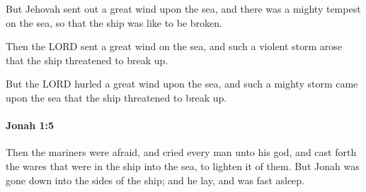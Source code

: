			\begin{versebox}
					\item[BHS] 
					\item[LXX] 
					\item[ASV] But Jehovah sent out a great wind upon the sea, and there was a mighty tempest on the sea, so that the ship was like to be broken.
					\item[NIV] Then the LORD sent a great wind on the sea, and such a violent storm arose that the ship threatened to break up.
					\item[NRSV] But the LORD hurled a great wind upon the sea, and such a mighty storm came upon the sea that the ship threatened to break up.
			\end{versebox}

		\paragraph{Jonah 1:5} %
			\label{JONAH-1-5}

			Then the mariners were afraid, and cried every man unto his god, and cast forth the wares that were in the ship into the sea, to lighten it of them. But Jonah was gone down into the sides of the ship; and he lay, and was fast asleep.

